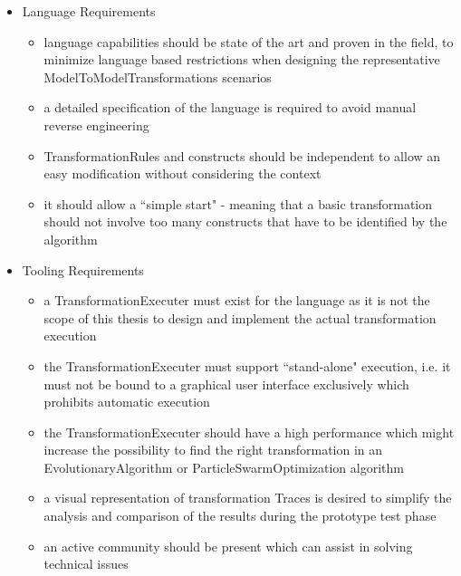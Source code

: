 \begin{itemize}
\item Language Requirements
	\begin{itemize}
	\item language capabilities should be state of the art and proven in the field, to minimize language based restrictions when designing the representative \glspl{ModelToModelTransformation} scenarios
	\item a detailed specification of the language is required to avoid manual reverse engineering	
	\item \glspl{TransformationRule} and constructs should be independent to allow an easy modification without considering the context	
	\item it should allow a ``simple start" - meaning that a basic transformation should not involve too many constructs that have to be identified by the algorithm	
	\end{itemize}

\item Tooling Requirements
	\begin{itemize}
	\item a \gls{TransformationExecuter} must exist for the language as it is not the scope of this thesis to design and implement the actual transformation execution
	\item the \gls{TransformationExecuter} must support ``stand-alone" execution, i.e. it must not be bound to a graphical user interface exclusively which prohibits automatic execution
	\item the \gls{TransformationExecuter} should have a high performance which might increase the possibility to find the right transformation in an \gls{EvolutionaryAlgorithm} or \gls{ParticleSwarmOptimization} algorithm
	\item a visual representation of transformation \glspl{Trace} is desired to simplify the analysis and comparison of the results during the prototype test phase
	\item an active community should be present which can assist in solving technical issues
	\end{itemize}
\end{itemize}


